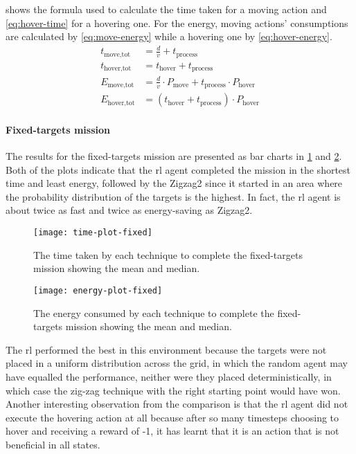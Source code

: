 \documentclass[../main.tex]{subfiles}
\begin{document}
 shows the formula used to
calculate the time taken for a moving action and
\cref{eq:hover-time} for a hovering one.
For the energy, moving actions' consumptions are calculated
by \cref{eq:move-energy} while a hovering one by
\cref{eq:hover-energy}.
\begin{align}
t_{\text{move,tot}} &= 
\frac{d}{v} + t_{\text{process}}
	\label{eq:move-time}
        \\
t_{\text{hover,tot}} &= 
t_{\text{hover}} + t_{\text{process}}
	\label{eq:hover-time}
        \\
E_{\text{move,tot}} &= 
\frac{d}{v} \cdot P_{\text{move}} 
+ t_{\text{process}} \cdot P_{\text{hover}}
	\label{eq:move-energy}
        \\
E_{\text{hover,tot}} &= 
\left( t_{\text{hover}} + t_{\text{process}} \right) \cdot P_{\text{hover}}
	\label{eq:hover-energy}
\end{align}

\paragraph{Fixed-targets mission}

The results for the fixed-targets mission are presented as bar charts in 
\cref{fig:time-plot-fixed} and \cref{fig:energy-plot-fixed}.
Both of the plots indicate that the \gls{rl} agent completed
the mission in the shortest time and least energy, followed
by the Zigzag2 since it started in an area 
where the probability
distribution of the targets is the highest.
In fact, the \gls{rl} agent is about twice as fast and twice
as energy-saving as Zigzag2.

\begin{figure}[tbp]
	\centering
	\texttt{[image: time-plot-fixed]}
	\caption{The time taken by each technique
            to complete the fixed-targets mission showing the mean and
    median.}
        \label{fig:time-plot-fixed}
\end{figure}

\begin{figure}[tbp]
	\centering
	\texttt{[image: energy-plot-fixed]}
	\caption{The energy consumed by each technique
            to complete the fixed-targets mission showing the mean and
    median.}
        \label{fig:energy-plot-fixed}
\end{figure}

The \gls{rl} performed the best in this environment because
the targets were not placed in a uniform distribution
across the grid,
in which the random agent may have equalled the performance,
neither were they placed deterministically, 
in which case the zig-zag technique with the
right starting point would have won.
Another interesting observation from the comparison is that
the \gls{rl} agent did not execute the hovering action at all
because after so many timesteps choosing to hover and
receiving a reward of -1, it has learnt that it is an
action that is not beneficial in all states.
\end{document}
